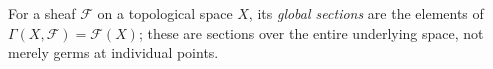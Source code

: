 
For a sheaf $\mathcal F$ on a topological space $X$, its \emph{global sections} are the elements of $\Gamma(X,\mathcal F)=\mathcal F(X)$; these are sections over the entire underlying space, not merely germs at individual points.
